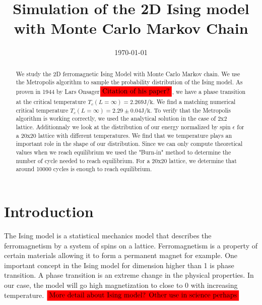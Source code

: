 \documentclass[english,notitlepage,reprint,nofootinbib]{revtex4-2}  %
\begin{document}
	
	\title{Simulation of the 2D Ising model with Monte Carlo Markov Chain}  %
	\author{} %
	\date{\today}                             %
	\noaffiliation                            %
	
	\begin{abstract}
	We study the 2D ferromagnetic Ising Model with Monte Carlo Markov chain. We use the Metropolis algorithm to sample the probability distribution of the Ising model.
	As proven in 1944 by Lars Onsager$\colorbox{red}{Citation of his paper?}$, we have a phase transition at the critical temperature $T_c(L=\infty)=2.269 \mathrm{J / k}$. We find a matching numerical 
	critical temperature $T_c(L=\infty) = 2.29 \pm 0.04 \mathrm{J / k}$. To verify that the Metropolis algorithm is working correctly, we used the analytical solution in the case 
	of 2x2 lattice. Additionnaly we look at the distribution of our energy normalized by spin $\epsilon$ for a 20x20 lattice with different temperatures. We find that
	we temperature plays an important role in the shape of our distribution. Since we can only compute theoretical values when we reach equilibrium we used the "Burn-in" 
	method to determine the number of cycle needed to reach equilibrium. For a 20x20 lattice, we determine that around 10000 cycles is enough to reach equilibrium.
	  
	\end{abstract}
	\maketitle	
	
	
	\section{Introduction} \label{sec:introduction}
	The Ising model is a statistical mechanics model that describes the ferromagnetism by a system of spins on a lattice. 
	Ferromagnetism is a property of certain materials allowing it to form a permanent magnet for example. One important concept in the Ising model for dimension 
	higher than 1 is phase transition. A phase transition is an extreme change in the physical properties. In our case, the model will go high magnetization to close to 
	0 with increasing temperature. $\colorbox{red}{More detail about Ising model? Other use in science perhaps}$\\
	
\end{document}
